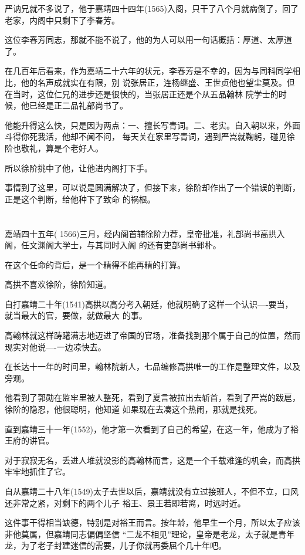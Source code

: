 \documentclass[11pt,a4paper,onecolumn]{article}
\begin{document}
严讷兄就不多说了，他于嘉靖四十四年(1565)入阁，只干了八个月就病倒了，回了老家，内阁中只剩下了李春芳。

这位李春芳同志，那就不能不说了，他的为人可以用一句话概括：厚道、太厚道了。

在几百年后看来，作为嘉靖二十六年的状元，李春芳是不幸的，因为与同科同学相比，他的名声成就实在有限，别
说张居正，连杨继盛、王世贞他也望尘莫及。但在当时，这位仁兄的进步还是很快的，当张居正还是个从五品翰林
院学士的时候，他已经是正二品礼部尚书了。

他能升得这么快，只是因为两点：一、擅长写青词。二、老实。自入朝以来，外面斗得你死我活，他却不闻不问，
每天关在家里写青词，遇到严嵩就鞠躬，碰见徐阶也敬礼，算是个老好人。

所以徐阶挑中了他，让他进内阁打下手。

事情到了这里，可以说是圆满解决了，但接下来，徐阶却作出了一个错误的判断，正是这个判断，给他种下了致命
的祸根。

\section[\thesection]{}

嘉靖四十五年( 1566)三月，经内阁首辅徐阶力荐，皇帝批准，礼部尚书高拱入阁，任文渊阁大学士，与其同时入阁
的还有吏部尚书郭朴。

在这个任命的背后，是一个精得不能再精的打算。

高拱不喜欢徐阶，徐阶知道。

自打嘉靖二十年(1541)高拱以高分考入朝廷，他就明确了这样一个认识----要当，就当最大的官，要做，就做最大
的事。

高翰林就这样踌躇满志地迈进了帝国的官场，准备找到那个属于自己的位置，然而现实对他说----一边凉快去。

在长达十一年的时间里，翰林院新人，七品编修高拱唯一的工作是整理文件，以及旁观。

他看到了郭勋在监牢里被人整死，看到了夏言被拉出去斩首，看到了严嵩的跋扈，徐阶的隐忍，他很聪明，他知道
如果现在去凑这个热闹，那就是找死。

直到嘉靖三十一年(1552)，他才第一次看到了自己的希望，在这一年，他成为了裕王府的讲官。

对于寂寂无名，丢进人堆就没影的高翰林而言，这是一个千载难逢的机会，而高拱牢牢地抓住了它。

自从嘉靖二十八年(1549)太子去世以后，嘉靖就没有立过接班人，不但不立，口风还非常之紧，对剩下的两个儿子
裕王、景王若即若离，时远时近。

这件事干得相当缺德，特别是对裕王而言。按年龄，他早生一个月，所以太子应该非他莫属，但嘉靖同志偏偏坚信
``二龙不相见''理论，皇帝是老龙，太子就是青年龙，为了老子封建迷信的需要，儿子你就再委屈个几十年吧。
\end{document}
